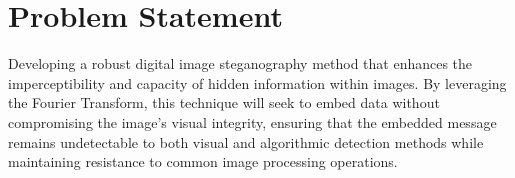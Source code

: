 \section{Problem Statement}
\label{sec:Problem Statement}
Developing a robust digital image steganography method that enhances the imperceptibility and capacity of hidden information within images. By leveraging the Fourier Transform, this technique will seek to embed data without compromising the image's visual integrity, ensuring that the embedded message remains undetectable to both visual and algorithmic detection methods while maintaining resistance to common image processing operations.